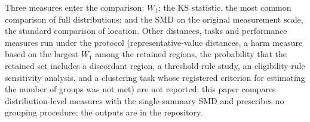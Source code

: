 \documentclass[AMA,Times1COL]{WileyNJDv5}
\begin{document}

Three measures enter the comparison: $W_1$; the KS statistic, the most common comparison of full distributions; and the SMD on the original measurement scale, the standard comparison of location. %
Other distances, tasks and performance measures run under the protocol (representative-value distances, a harm measure based on the largest $W_1$ among the retained regions, the probability that the retained set includes a discordant region, a threshold-rule study, an eligibility-rule sensitivity analysis, and a clustering task whose registered criterion for estimating the number of groups was not met) are not reported; this paper compares distribution-level measures with the single-summary SMD and prescribes no grouping procedure; the outputs are in the repository.
\end{document}
